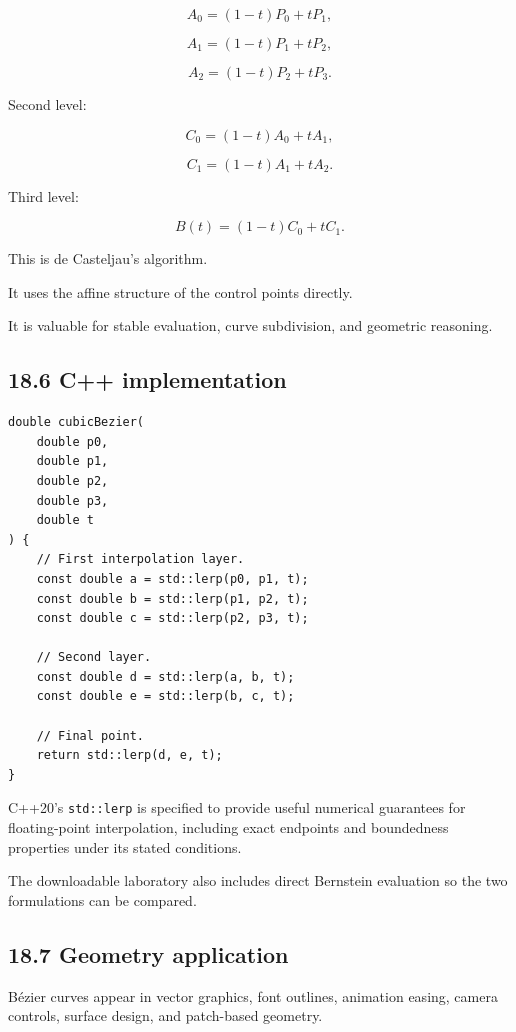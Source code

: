 \[ A_0=(1-t)P_0+tP_1, \]

\[ A_1=(1-t)P_1+tP_2, \]

\[ A_2=(1-t)P_2+tP_3. \]

Second level:

\[ C_0=(1-t)A_0+tA_1, \]

\[ C_1=(1-t)A_1+tA_2. \]

Third level:

\[ \boxed{ B(t)=(1-t)C_0+tC_1 }. \]

This is de Casteljau's algorithm.

It uses the affine structure of the control points directly.

It is valuable for stable evaluation, curve subdivision, and geometric reasoning.

\subsection{18.6 C++ implementation}\label{02-foundations-ii-ch028-c-implementation}

\begin{verbatim}
double cubicBezier(
    double p0,
    double p1,
    double p2,
    double p3,
    double t
) {
    // First interpolation layer.
    const double a = std::lerp(p0, p1, t);
    const double b = std::lerp(p1, p2, t);
    const double c = std::lerp(p2, p3, t);

    // Second layer.
    const double d = std::lerp(a, b, t);
    const double e = std::lerp(b, c, t);

    // Final point.
    return std::lerp(d, e, t);
}
\end{verbatim}

C++20's \texttt{std::lerp} is specified to provide useful numerical guarantees for floating-point interpolation, including exact endpoints and boundedness properties under its stated conditions.

The downloadable laboratory also includes direct Bernstein evaluation so the two formulations can be compared.

\subsection{18.7 Geometry application}\label{02-foundations-ii-ch028-geometry-application}

Bézier curves appear in vector graphics, font outlines, animation easing, camera controls, surface design, and patch-based geometry.

